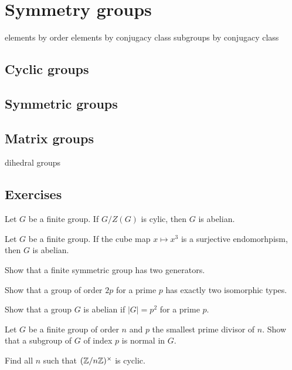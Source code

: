 \documentclass{../note}
\begin{document}
\chapter{Symmetry groups}

elements by order
elements by conjugacy class
subgroups by conjugacy class


\section{Cyclic groups}
\section{Symmetric groups}
\section{Matrix groups}
dihedral groups


\section*{Exercises}

\begin{prb}
Let $G$ be a finite group.
If $G/Z(G)$ is cylic, then $G$ is abelian.
\end{prb}

\begin{prb}
Let $G$ be a finite group.
If the cube map $x\mapsto x^3$ is a surjective endomorhpism, then $G$ is abelian.
\end{prb}

\begin{prb}
Show that a finite symmetric group has two generators.
\end{prb}

\begin{prb}
Show that a group of order $2p$ for a prime $p$ has exactly two isomorphic types.
\end{prb}

\begin{prb}
Show that a group $G$ is abelian if $|G|=p^2$ for a prime $p$.
\end{prb}

\begin{prb}
Let $G$ be a finite group of order $n$ and $p$ the smallest prime divisor of $n$.
Show that a subgroup of $G$ of index $p$ is normal in $G$.
\end{prb}

\begin{prb}
Find all $n$ such that $(\mathbb{Z}/n\mathbb{Z})^\times$ is cyclic.
\end{prb}
\end{document}
